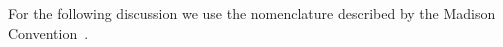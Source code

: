 For the following discussion we use the nomenclature described by the Madison Convention~\cite{MadisonConv}.